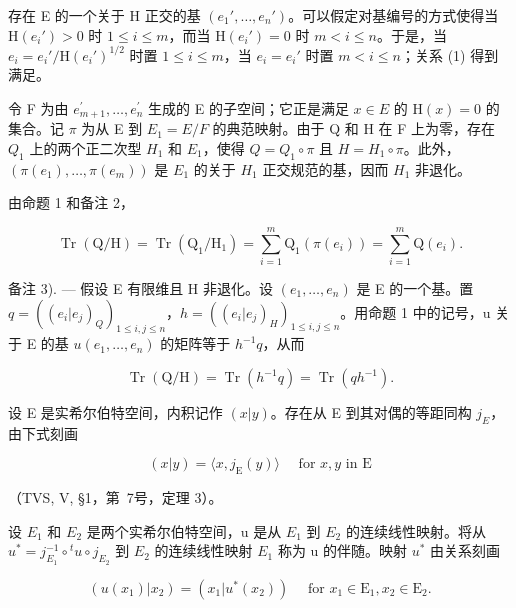 存在 E 的一个关于 H 正交的基 \((e_1', \ldots, e_n')\)。可以假定对基编号的方式使得当 \(\mathrm{H}(e_i') > 0\) 时 \(1 \leqslant i \leqslant m\)，而当 \(\mathrm{H}(e_i') = 0\) 时 \(m < i \leqslant n\)。于是，当 \(e_i = e_i' / \mathrm{H}(e_i')^{1/2}\) 时置 \(1 \leqslant i \leqslant m\)，当 \(e_i = e_i'\) 时置 \(m < i \leqslant n\)；关系 (1) 得到满足。

令 F 为由 \(e_{m+1}^{\prime},\ldots,e_{n}^{\prime}\) 生成的 E 的子空间；它正是满足 \(x\in E\) 的 \(\mathrm{H}(x)=0\) 的集合。记 \(\pi\) 为从 E 到 \(E_{1}=E/F\) 的典范映射。由于 Q 和 H 在 F 上为零，存在 \(Q_{1}\) 上的两个正二次型 \(H_{1}\) 和 \(E_{1}\)，使得 \(Q=Q_{1}\circ\pi\) 且 \(H=H_{1}\circ\pi\)。此外，\((\pi(e_{1}),\ldots,\pi(e_{m}))\) 是 \(E_{1}\) 的关于 \(H_{1}\) 正交规范的基，因而 \(H_{1}\) 非退化。

由命题 1 和备注 2，

\[
\operatorname{Tr} \left(\mathrm{Q} / \mathrm{H}\right) = \operatorname{Tr} \left(\mathrm{Q} _ {1} / \mathrm{H} _ {1}\right) = \sum_ {i = 1} ^ {m} \mathrm{Q} _ {1} \left(\pi (e _ {i})\right) = \sum_ {i = 1} ^ {m} \mathrm{Q} (e _ {i}).\tag{Q.E.D.}
\]

备注 3). --- 假设 E 有限维且 H 非退化。设 \((e_1, \ldots, e_n)\) 是 E 的一个基。置 \(q = ((e_i | e_j)_Q)_{1 \leqslant i, j \leqslant n}\)，\(h = ((e_i | e_j)_H)_{1 \leqslant i, j \leqslant n}\)。用命题 1 中的记号，u 关于 E 的基 \(u\)\((e_1, \ldots, e_n)\) 的矩阵等于 \(h^{-1}q\)，从而

\[
\operatorname{Tr} \left(\mathrm{Q} / \mathrm{H}\right) = \operatorname{Tr} \left(h ^ {- 1} q\right) = \operatorname{Tr} \left(q h ^ {- 1}\right).\tag{2}
\]


设 E 是实希尔伯特空间，内积记作 \((x|y)\)。存在从 E 到其对偶的等距同构 \(j_{E}\)，由下式刻画

\[
(x | y) = \langle x, j _ {\mathrm{E}} (y) \rangle \quad \text { for } x, y \text { in } \mathrm{E}\tag{3}
\]

（TVS, V, §1，第~7号，定理 3）。

设 \(E_{1}\) 和 \(E_{2}\) 是两个实希尔伯特空间，u 是从 \(E_{1}\) 到 \(E_{2}\) 的连续线性映射。将从 \(u^{*} = j_{E_{1}}^{-1} \circ {}^{t}u \circ j_{E_{2}}\) 到 \(E_{2}\) 的连续线性映射 \(E_{1}\) 称为 u 的伴随。映射 \(u^{*}\) 由关系刻画

\[
(u (x _ {1}) | x _ {2}) = (x _ {1} | u ^ {*} (x _ {2})) \quad \text { for } x _ {1} \in \mathrm{E} _ {1}, x _ {2} \in \mathrm{E} _ {2}.\tag{4}
\]


